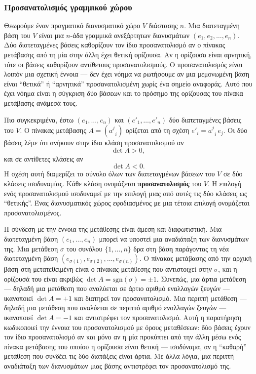 \documentclass[11pt,a4paper,twoside,openright]{book}
\begin{document}
\subsubsection{Προσανατολισμός γραμμικού χώρου}

Θεωρούμε έναν πραγματικό διανυσματικό χώρο $V$ διάστασης $n$. Μια διατεταγμένη βάση του $V$ είναι μια $n$-άδα γραμμικά ανεξάρτητων διανυσμάτων $(e_1, e_2, \dots, e_n)$. Δύο διατεταγμένες βάσεις καθορίζουν τον ίδιο προσανατολισμό αν ο πίνακας μετάβασης από τη μία στην άλλη έχει θετική ορίζουσα. Αν η ορίζουσα είναι αρνητική, τότε οι βάσεις καθορίζουν αντίθετους προσανατολισμούς. Ο προσανατολισμός είναι λοιπόν μια σχετική έννοια --- δεν έχει νόημα να ρωτήσουμε αν μια μεμονωμένη βάση είναι ``θετικά'' ή ``αρνητικά'' προσανατολισμένη χωρίς ένα σημείο αναφοράς. Αυτό που έχει νόημα είναι η σύγκριση δύο βάσεων και το πρόσημο της ορίζουσας του πίνακα μετάβασης ανάμεσά τους.

Πιο συγκεκριμένα, έστω $(e_1, \dots, e_n)$ και $(e'_1, \dots, e'_n)$ δύο διατεταγμένες βάσεις του $V$. Ο πίνακας μετάβασης $A = (a^j_{\;\; i})$ ορίζεται από τη σχέση $e'_i = a^j_{\;\; i} \, e_j$. Οι δύο βάσεις λέμε ότι ανήκουν στην ίδια κλάση προσανατολισμού αν
\[
\det A > 0,
\]
και σε αντίθετες κλάσεις αν
\[
\det A < 0.
\]
Η σχέση αυτή διαμερίζει το σύνολο όλων των διατεταγμένων βάσεων του $V$ σε δύο κλάσεις ισοδυναμίας. Κάθε κλάση ονομάζεται \textbf{προσανατολισμός} του $V$. Η επιλογή ενός προσανατολισμού ισοδυναμεί με την επιλογή μιας από αυτές τις δύο κλάσεις ως ``θετικής''. Ένας διανυσματικός χώρος εφοδιασμένος με μια τέτοια επιλογή ονομάζεται προσανατολισμένος.

Η σύνδεση με την έννοια της μετάθεσης είναι άμεση και διαφωτιστική. Μια διατεταγμένη βάση $(e_1, \dots, e_n)$ μπορεί να υποστεί μια αναδιάταξη των διανυσμάτων της. Μια μετάθεση $\sigma$ του συνόλου $\{1, \dots, n\}$ δρα στη βάση παράγοντας τη νέα διατεταγμένη βάση $(e_{\sigma(1)}, e_{\sigma(2)}, \dots, e_{\sigma(n)})$. Ο πίνακας μετάβασης από την αρχική βάση στη μετατεθειμένη είναι ο πίνακας μετάθεσης που αντιστοιχεί στην $\sigma$, και η ορίζουσά του είναι ακριβώς $\det A = \text{sgn}(\sigma) = \pm 1$. Συνεπώς, μια άρτια μετάθεση --- δηλαδή μια μετάθεση που αναλύεται σε άρτιο αριθμό εναλλαγών ζευγών --- ικανοποιεί $\det A = +1$ και διατηρεί τον προσανατολισμό. Μια περιττή μετάθεση --- δηλαδή μια μετάθεση που αναλύεται σε περιττό αριθμό εναλλαγών ζευγών --- ικανοποιεί $\det A = -1$ και αντιστρέφει τον προσανατολισμό. Αυτή η παρατήρηση κωδικοποιεί την έννοια του προσανατολισμού με όρους μεταθέσεων: δύο βάσεις έχουν τον ίδιο προσανατολισμό αν και μόνο αν η μία προκύπτει από την άλλη μέσω ενός πίνακα μετάβασης του οποίου η ορίζουσα είναι θετική --- ισοδύναμα, αν η ``καθαρή'' μετάθεση που συνδέει τις δύο διατάξεις είναι άρτια. Με άλλα λόγια, μια περιττή αναδιάταξη των διανυσμάτων μιας βάσης αντιστρέφει τον προσανατολισμό της.
\end{document}
